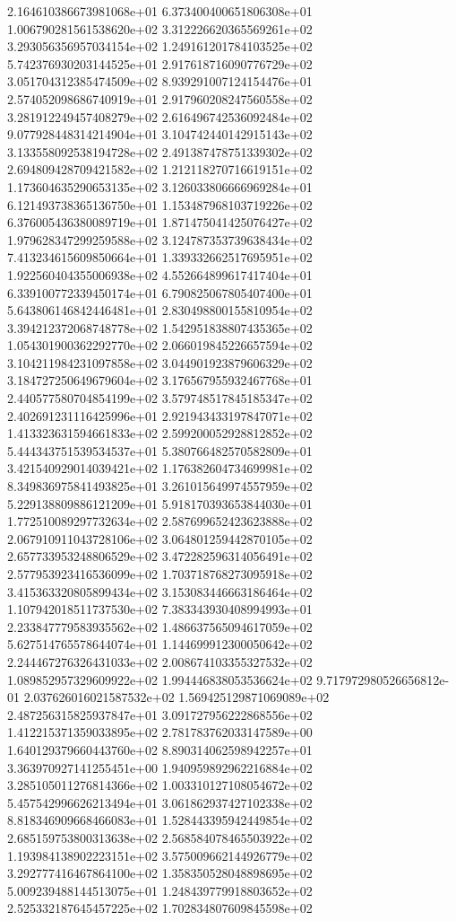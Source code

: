 2.164610386673981068e+01 6.373400400651806308e+01 1.006790281561538620e+02
3.312226620365569261e+02 3.293056356957034154e+02 1.249161201784103525e+02
5.742376930203144525e+01 2.917618716090776729e+02 3.051704312385474509e+02
8.939291007124154476e+01 2.574052098686740919e+01 2.917960208247560558e+02
3.281912249457408279e+02 2.616496742536092484e+02 9.077928448314214904e+01
3.104742440142915143e+02 3.133558092538194728e+02 2.491387478751339302e+02
2.694809428709421582e+02 1.212118270716619151e+02 1.173604635290653135e+02
3.126033806666969284e+01 6.121493738365136750e+01 1.153487968103719226e+02
6.376005436380089719e+01 1.871475041425076427e+02 1.979628347299259588e+02
3.124787353739638434e+02 7.413234615609850664e+01 1.339332662517695951e+02
1.922560404355006938e+02 4.552664899617417404e+01 6.339100772339450174e+01
6.790825067805407400e+01 5.643806146842446481e+01 2.830498800155810954e+02
3.394212372068748778e+02 1.542951838807435365e+02 1.054301900362292770e+02
2.066019845226657594e+02 3.104211984231097858e+02 3.044901923879606329e+02
3.184727250649679604e+02 3.176567955932467768e+01 2.440577580704854199e+02
3.579748517845185347e+02 2.402691231116425996e+01 2.921943433197847071e+02
1.413323631594661833e+02 2.599200052928812852e+02 5.444343751539534537e+01
5.380766482570582809e+01 3.421540929014039421e+02 1.176382604734699981e+02
8.349836975841493825e+01 3.261015649974557959e+02 5.229138809886121209e+01
5.918170393653844030e+01 1.772510089297732634e+02 2.587699652423623888e+02
2.067910911043728106e+02 3.064801259442870105e+02 2.657733953248806529e+02
3.472282596314056491e+02 2.577953923416536099e+02 1.703718768273095918e+02
3.415363320805899434e+02 3.153083446663186464e+02 1.107942018511737530e+02
7.383343930408994993e+01 2.233847779583935562e+02 1.486637565094617059e+02
5.627514765578644074e+01 1.144699912300050642e+02 2.244467276326431033e+02
2.008674103355327532e+02 1.089852957329609922e+02 1.994446838053536624e+02
9.717972980526656812e-01 2.037626016021587532e+02 1.569425129871069089e+02
2.487256315825937847e+01 3.091727956222868556e+02 1.412215371359033895e+02
2.781783762033147589e+00 1.640129379660443760e+02 8.890314062598942257e+01
3.363970927141255451e+00 1.940959892962216884e+02 3.285105011276814366e+02
1.003310127108054672e+02 5.457542996626213494e+01 3.061862937427102338e+02
8.818346909668466083e+01 1.528443395942449854e+02 2.685159753800313638e+02
2.568584078465503922e+02 1.193984138902223151e+02 3.575009662144926779e+02
3.292777416467864100e+02 1.358350528048898695e+02 5.009239488144513075e+01
1.248439779918803652e+02 2.525332187645457225e+02 1.702834807609845598e+02
